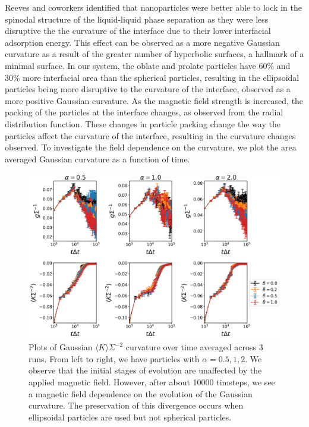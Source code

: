 Reeves and coworkers identified that nanoparticles were better able to
lock in the spinodal structure of the liquid-liquid phase separation as
they were less disruptive the the curvature of the interface due to
their lower interfacial adsorption energy. This effect can be observed
as a more negative Gaussian curvature as a result of the greater number
of hyperbolic surfaces, a hallmark of a minimal surface. In our system,
the oblate and prolate particles have 60\% and 30\% more interfacial
area than the spherical particles, resulting in the ellipsoidal
particles being more disruptive to the curvature of the interface,
observed as a more positive Gaussian curvature. As the magnetic field
strength is increased, the packing of the particles at the interface
changes, as observed from the radial distribution function.
\cite{karthikeyan_formation_2024} These changes in particle packing
change the way the particles affect the curvature of the interface,
resulting in the curvature changes observed. To investigate the field
dependence on the curvature, we plot the area averaged Gaussian
curvature as a function of time.

\begin{figure} 
    \centering 
    \includegraphics[scale = 0.4]{figures/results/paper1/genus_curvature_vs_coverage.png} 
    \caption{Plots of Gaussian $\langle K \rangle \Sigma^{-2}$ curvature over time averaged across 3 runs. 
    From left to right, we have particles with $\alpha = 0.5, 1, 2$. We observe that the initial stages of 
    evolution are unaffected by the applied magnetic field. However, after about 10000 timsteps, we see a 
    magnetic field dependence on the evolution of the Gaussian curvature. The preservation of this divergence 
    occurs when ellipsoidal particles are used but not spherical particles.} 
    \label{fig:curvature_vs_coverage}
\end{figure}


